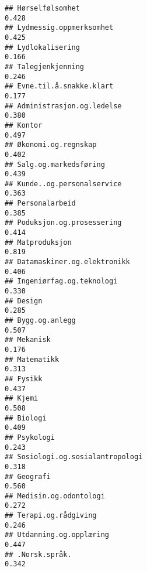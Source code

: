 \documentclass[
]{article}
\begin{document}
\begin{verbatim}
## Hørselfølsomhet                                                                  0.428
## Lydmessig.oppmerksomhet                                                          0.425
## Lydlokalisering                                                                  0.166
## Talegjenkjenning                                                                 0.246
## Evne.til.å.snakke.klart                                                          0.177
## Administrasjon.og.ledelse                                                        0.380
## Kontor                                                                           0.497
## Økonomi.og.regnskap                                                              0.402
## Salg.og.markedsføring                                                            0.439
## Kunde..og.personalservice                                                        0.363
## Personalarbeid                                                                   0.385
## Poduksjon.og.prosessering                                                        0.414
## Matproduksjon                                                                    0.819
## Datamaskiner.og.elektronikk                                                      0.406
## Ingeniørfag.og.teknologi                                                         0.330
## Design                                                                           0.285
## Bygg.og.anlegg                                                                   0.507
## Mekanisk                                                                         0.176
## Matematikk                                                                       0.313
## Fysikk                                                                           0.437
## Kjemi                                                                            0.508
## Biologi                                                                          0.409
## Psykologi                                                                        0.243
## Sosiologi.og.sosialantropologi                                                   0.318
## Geografi                                                                         0.560
## Medisin.og.odontologi                                                            0.272
## Terapi.og.rådgiving                                                              0.246
## Utdanning.og.opplæring                                                           0.447
## .Norsk.språk.                                                                    0.342

\end{verbatim}
\end{document}
